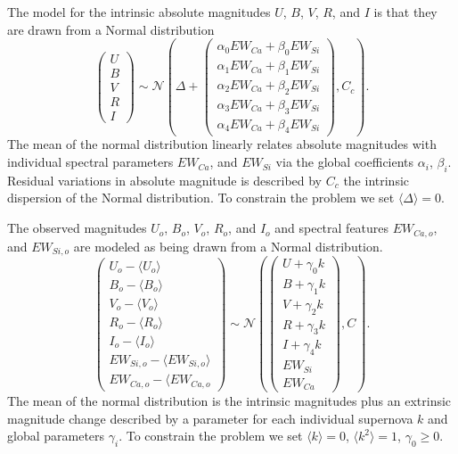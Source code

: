 \documentclass[11pt, oneside]{article}   	%
\begin{document}
The model for the intrinsic absolute magnitudes $U$, $B$, $V$, $R$, and $I$ is that they are drawn from a Normal distribution
\begin{equation*}
\left(
\begin{matrix}
U\\B\\V\\R\\I
\end{matrix}
\right) \sim \mathcal{N}
\left(
\Delta +
\left(
\begin{matrix}
\alpha_0 EW_{Ca} + \beta_0 EW_{Si} \\
\alpha_1 EW_{Ca} + \beta_1 EW_{Si}  \\
\alpha_2 EW_{Ca} + \beta_2 EW_{Si} \\
\alpha_3 EW_{Ca} + \beta_3 EW_{Si} \\
\alpha_4 EW_{Ca} + \beta_4 EW_{Si}
\end{matrix}
\right)
,C_{c}
\right).
\end{equation*}
The mean of the normal distribution linearly relates absolute magnitudes with
individual spectral parameters  $EW_{Ca}$, and $EW_{Si}$ via the  global coefficients
 $\alpha_i$, $\beta_i$.  Residual variations in absolute magnitude is described
 by  $C_c$ the intrinsic dispersion of the Normal distribution.  To constrain the problem we
 set $\langle \Delta \rangle=0$.

The observed magnitudes  $U_o$, $B_o$, $V_o$, $R_o$, and $I_o$  and spectral features  $EW_{Ca,o}$, and $EW_{Si,o}$ are modeled
as being drawn from a Normal distribution. 
\begin{equation*}
\left(
\begin{matrix}
U_o -\langle U_o \rangle \\B_o-\langle B_o \rangle\\ V_o-\langle V_o \rangle\\R_o-\langle R_o \rangle\\I_o-\langle I_o \rangle\\EW_{Si, o}-\langle EW_{Si, o} \rangle\\ EW_{Ca, o}-\langle EW_{Ca, o} \end{matrix}
\right) \sim \mathcal{N}
\left(
\left(
\begin{matrix}
U +\gamma_0 k \\B +\gamma_1 k \\V+\gamma_2 k\\R+\gamma_3 k\\I+\gamma_4 k\\
EW_{Si}\\ EW_{Ca}
\end{matrix}
\right)
,C
\right).
\end{equation*}
The mean of the normal distribution is the intrinsic magnitudes plus an extrinsic magnitude change described by a parameter for each individual supernova
$k$ and global parameters $\gamma_i$.  
To constrain the problem we set  $\langle k \rangle=0$, $\langle k^2 \rangle=1$, $\gamma_0 \ge 0$.
\end{document}
